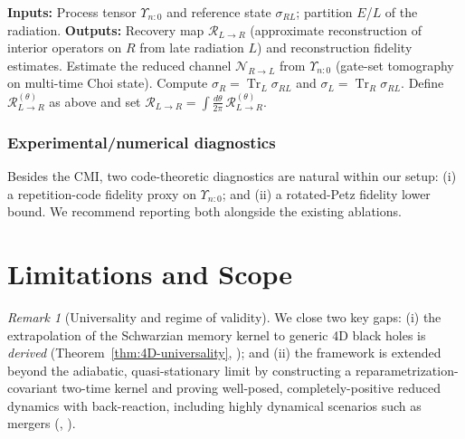 \documentclass[11pt,a4paper]{article}
\newcommand{\HMC}{\textsc{HMC}\xspace}
\newcommand{\Tr}{\operatorname{Tr}}
\theoremstyle{plain}
\theoremstyle{definition}
\theoremstyle{remark}
\newtheorem{remark}[theorem]{Remark}
\begin{document}
\begin{algorithm}[t!]
\caption{QEC reconstruction for \HMC{} via rotated Petz.}
\label{alg:rotated_petz_hmc}
\begin{algorithmic}[1]
\State \textbf{Inputs:} Process tensor $\Upsilon_{n{:}0}$ and reference state $\sigma_{RL}$; partition $E$/$L$ of the radiation.
\State \textbf{Outputs:} Recovery map $\mathcal{R}_{L\to R}$ (approximate reconstruction of interior operators on $R$ from late radiation $L$) and reconstruction fidelity estimates.
\State Estimate the reduced channel $\mathcal{N}_{R\to L}$ from $\Upsilon_{n{:}0}$ (gate-set tomography on multi-time Choi state).
\State Compute $\sigma_R=\Tr_L\sigma_{RL}$ and $\sigma_L=\Tr_R\sigma_{RL}$.
\State Define $\mathcal{R}^{(\theta)}_{L\to R}$ as above and set $\mathcal{R}_{L\to R} = \int \frac{d\theta}{2\pi}\,\mathcal{R}^{(\theta)}_{L\to R}$.
\end{algorithmic}
\end{algorithm}

\subsubsection{Experimental/numerical diagnostics}
Besides the CMI, two code-theoretic diagnostics are natural within our setup: (i) a repetition-code fidelity proxy on $\Upsilon_{n{:}0}$; and (ii) a rotated-Petz fidelity lower bound. We recommend reporting both alongside the existing ablations.


\section{Limitations and Scope}
\label{sec:limitations}
\begin{remark}[Universality and regime of validity]
\label{rem:limitations}
We close two key gaps: (i) the extrapolation of the Schwarzian memory kernel to generic 4D black holes is \emph{derived} (Theorem~\ref{thm:4D-universality}, ); and (ii) the framework is extended beyond the adiabatic, quasi-stationary limit by constructing a reparametrization-covariant two-time kernel and proving well-posed, completely-positive reduced dynamics with back-reaction, including highly dynamical scenarios such as mergers (, ).
\end{remark}
\end{document}
